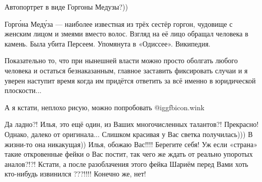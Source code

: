 \begin{itemize}

Автопортрет в виде Горгоны Медузы?))

Горго́на Меду́за — наиболее известная из трёх сестёр горгон, чудовище с женским
лицом и змеями вместо волос. Взгляд на её лицо обращал человека в камень. Была
убита Персеем. Упомянута в «Одиссее». Википедия.


Показательно то, что при нынешней власти можно просто оболгать любого человека
и остаться безнаказанным, главное заставить фиксировать случаи и я уверен
наступит время когда им придётся ответить за всё именно в юридической
плоскости...

А я кстати, неплохо рисую, можно попробовать  @igg{fbicon.wink} 


Да ладно?! Илья, это ещё один, из Ваших многочисленных талантов?! Прекрасно!
Однако, далеко от оригинала... Слишком красивая у Вас светка получилась))) В
жизни-то она никакущая)) Илья, обожаю Вас!!!! Берегите себя! Уж если «страна»
такие откровенные фейки о Вас постит, так чего же ждать от реально упоротых
аналов?!?! Кстати, а после разоблачения этого фейка Шариём перед Вами хоть
кто-нибудь извинился ???!!!! Конечно же, нет!

\end{itemize} %
